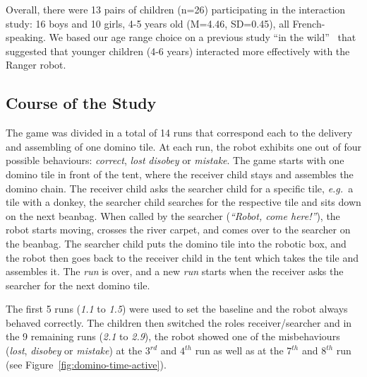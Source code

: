 \documentclass[letterpaper, 10pt, conference]{ieeeconf}
\newcommand{\eg}{{\textit{e.g.~}}}
\begin{document}

Overall, there were 13 pairs of children (n=26) participating in the interaction
study: 16 boys and 10 girls, 4-5 years old (M=4.46, SD=0.45), all
French-speaking. We based our age range choice on a previous study ``in the
wild''~\cite{fink2014which} that suggested that younger children (4-6 years)
interacted more effectively with the Ranger robot.



\subsection{Course of the Study}

The game was divided in a total of 14 runs that correspond each to the delivery
and assembling of one domino tile. At each run, the robot exhibits one out of
four possible behaviours: \emph{correct}, \emph{lost} \emph{disobey} or
\emph{mistake}.  The game starts with one domino tile in front of the tent,
where the receiver child stays and assembles the domino chain. The receiver
child asks the searcher child for a specific tile, \eg a tile with a donkey, the
searcher child searches for the respective tile and sits down on the next
beanbag. When called by the searcher (\textit{``Robot, come here!''}), the robot
starts moving, crosses the river carpet, and comes over to the searcher on the
beanbag. The searcher child puts the domino tile into the robotic box, and the
robot then goes back to the receiver child in the tent which takes the tile and
assembles it. The \emph{run} is over, and a new \emph{run} starts when the
receiver asks the searcher for the next domino tile.

The first 5 runs (\emph{1.1} to \emph{1.5}) were used to set
the baseline and the robot always behaved correctly. The children then switched
the roles receiver/searcher and in the 9 remaining runs (\emph{2.1} to
\emph{2.9}), the robot showed one of the misbehaviours (\emph{lost},
\emph{disobey} or \emph{mistake}) at the $3^{rd}$ and $4^{th}$ run as well as at
the $7^{th}$ and $8^{th}$ run (see Figure~\ref{fig:domino-time-active}).
\end{document}
